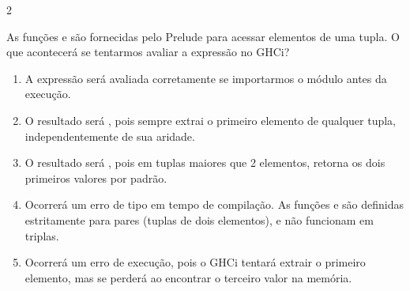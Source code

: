 \documentclass[a4paper,10pt,brazil]{article}
\begin{document}
\begin{multicols}{2}
\begin{enumerate}
\end{enumerate}

As funções  e  são fornecidas pelo Prelude para acessar elementos de uma tupla. O que acontecerá se tentarmos avaliar a expressão  no GHCi?

\begin{enumerate}
  \item A expressão será avaliada corretamente se importarmos o módulo  antes da execução.

  \item O resultado será , pois  sempre extrai o primeiro elemento de qualquer tupla, independentemente de sua aridade.

  \item O resultado será , pois em tuplas maiores que 2 elementos,  retorna os dois primeiros valores por padrão.

  \item Ocorrerá um erro de tipo em tempo de compilação. As funções  e  são definidas estritamente para pares (tuplas de dois elementos), e não funcionam em triplas.

  \item Ocorrerá um erro de execução, pois o GHCi tentará extrair o primeiro elemento, mas se perderá ao encontrar o terceiro valor na memória.


\end{enumerate}


\end{multicols}
\end{document}
